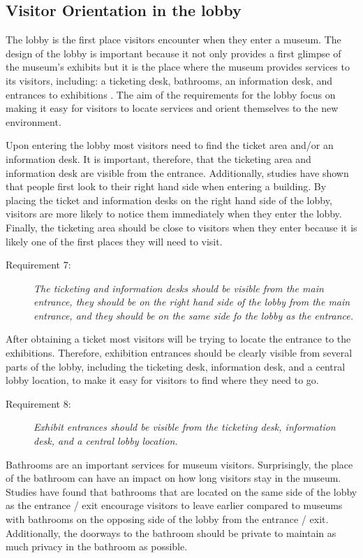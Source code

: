 \documentclass[12pt]{ucthesis}
\begin{document}
\subsection{Visitor Orientation in the lobby}
The lobby is the first place visitors encounter when they enter a museum. The design of the lobby is important because it not only provides a first glimpse of the museum's exhibits but it is the place where the museum provides services to its visitors, including: a ticketing desk, bathrooms, an information desk, and entrances to exhibitions \cite{Bitgood02}. The aim of the requirements for the lobby focus on making it easy for visitors to locate services and orient themselves to the new environment. 

Upon entering the lobby most visitors need to find the ticket area and/or an information desk. It is important, therefore, that the ticketing area and information desk are visible from the entrance. Additionally, studies have shown that people first look to their right hand side when entering a building. By placing the ticket and information desks on the right hand side of the lobby, visitors are more likely to notice them immediately when they enter the lobby. Finally, the ticketing area should be close to visitors when they enter because it is likely one of the first places they will need to visit.
\begin{description}
\item[Requirement 7:] \emph{The ticketing and information desks should be visible from the main entrance, they should be on the right hand side of the lobby from the main entrance, and they should be on the same side fo the lobby as the  entrance.}
\end{description}

After obtaining a ticket most visitors will be trying to locate the entrance to the exhibitions. Therefore, exhibition entrances should be clearly visible from several parts of the lobby, including the ticketing desk, information desk, and a central lobby location, to make it easy for visitors to find where they need to go. 
\begin{description}
\item[Requirement 8:] \emph{Exhibit entrances should be visible from the ticketing desk, information desk, and a central lobby location.}
\end{description}

Bathrooms are an important services for museum visitors. Surprisingly, the place of the bathroom can have an impact on how long visitors stay in the museum. Studies \cite{tbd} have found that bathrooms that are located on the same side of the lobby as the entrance / exit encourage visitors to leave earlier compared to museums with bathrooms on the opposing side of the lobby from the entrance / exit. Additionally, the doorways to the bathroom should be private to maintain as much privacy in the bathroom as possible.
\end{document}
